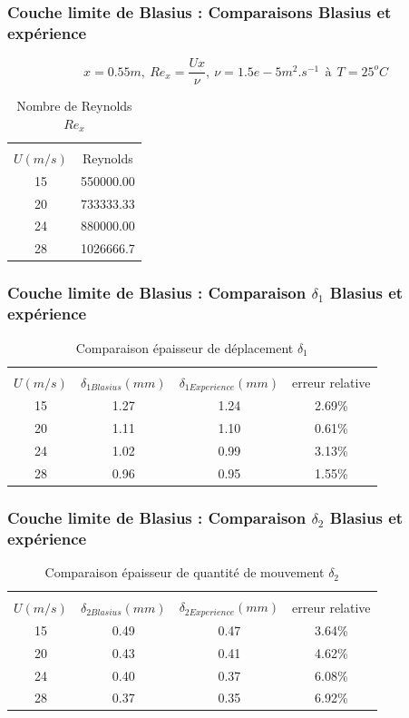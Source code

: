 \documentclass{beamer}
\begin{document}
\begin{frame}
\frametitle{Couche limite de Blasius : Comparaisons Blasius et expérience}
\begin{equation*}
	x = 0.55m,~Re_{x} = \frac{Ux}{\nu},~
	\nu = 1.5e-5 m^{2}.s^{-1}~~\text{à}~~T = 25^{o}C
\end{equation*}

\begin{table}[ht]
	\centering
	\begin{tabular}{cc}
		\hline\\
		$U(m/s)$ & Reynolds\\
		\hline
   15 & 550000.00\\
   20 & 733333.33\\
   24 & 880000.00\\
   28 & 1026666.7
	\end{tabular}
	\caption{Nombre de Reynolds $Re_{x}$}
\end{table}
\end{frame}

\begin{frame}
\frametitle{Couche limite de Blasius : Comparaison $\delta_{1}$ Blasius et expérience}
\begin{table}[ht]
	\centering
	\begin{tabular}{cccc}
		\hline\\
		$U(m/s)$ & $\delta_{1Blasius}(mm)$ &
		$ \delta_{1Experience}(mm)$ & 
		 erreur relative\\
		\hline
		15   & 1.27   & 1.24   & 2.69\%\\
		20   & 1.11   & 1.10   & 0.61\%\\
		24   & 1.02   & 0.99   & 3.13\%\\
		28   & 0.96   & 0.95   & 1.55\%
	\end{tabular}
	\caption{Comparaison épaisseur de déplacement $\delta_{1}$}
\end{table}
\end{frame}

\begin{frame}
\frametitle{Couche limite de Blasius : Comparaison $\delta_{2}$ Blasius et expérience}
\begin{table}[ht]
	\centering
	\begin{tabular}{cccc}
		\hline\\
		$U(m/s)$ & $\delta_{2Blasius}(mm)$ &
		$ \delta_{2Experience}(mm)$ & 
		 erreur relative\\
		\hline
   15 & 0.49   & 0.47   & 3.64\%\\
   20 & 0.43   & 0.41   & 4.62\%\\
   24 & 0.40   & 0.37   & 6.08\%\\
   28 & 0.37   & 0.35   & 6.92\%
	\end{tabular}
	\caption{Comparaison épaisseur de quantité de mouvement $\delta_{2}$}
\end{table}
\end{frame}
\end{document}

